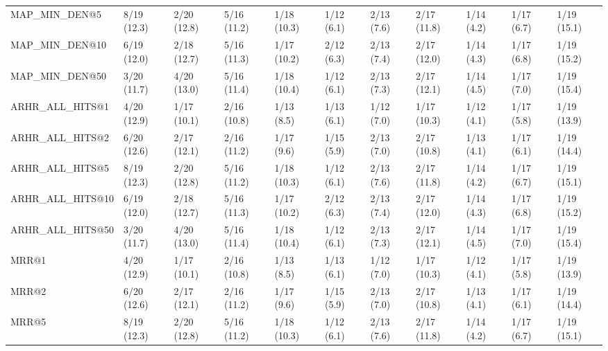 \begin{tabular}{lllllllllll}
MAP_MIN_DEN@5               &    8/19 (12.3) &    2/20 (12.8) &     5/16 (11.2) &      1/18 (10.3) &  1/12 (6.1) &  2/13 (7.6) &  2/17 (11.8) &     1/14 (4.2) &            1/17 (6.7) &        1/19 (15.1) \\
MAP_MIN_DEN@10              &    6/19 (12.0) &    2/18 (12.7) &     5/16 (11.3) &      1/17 (10.2) &  2/12 (6.3) &  2/13 (7.4) &  2/17 (12.0) &     1/14 (4.3) &            1/17 (6.8) &        1/19 (15.2) \\
MAP_MIN_DEN@50              &    3/20 (11.7) &    4/20 (13.0) &     5/16 (11.4) &      1/18 (10.4) &  1/12 (6.1) &  2/13 (7.3) &  2/17 (12.1) &     1/14 (4.5) &            1/17 (7.0) &        1/19 (15.4) \\
ARHR_ALL_HITS@1             &    4/20 (12.9) &    1/17 (10.1) &     2/16 (10.8) &       1/13 (8.5) &  1/13 (6.1) &  1/12 (7.0) &  1/17 (10.3) &     1/12 (4.1) &            1/17 (5.8) &        1/19 (13.9) \\
ARHR_ALL_HITS@2             &    6/20 (12.6) &    2/17 (12.1) &     2/16 (11.2) &       1/17 (9.6) &  1/15 (5.9) &  2/13 (7.0) &  2/17 (10.8) &     1/13 (4.1) &            1/17 (6.1) &        1/19 (14.4) \\
ARHR_ALL_HITS@5             &    8/19 (12.3) &    2/20 (12.8) &     5/16 (11.2) &      1/18 (10.3) &  1/12 (6.1) &  2/13 (7.6) &  2/17 (11.8) &     1/14 (4.2) &            1/17 (6.7) &        1/19 (15.1) \\
ARHR_ALL_HITS@10            &    6/19 (12.0) &    2/18 (12.7) &     5/16 (11.3) &      1/17 (10.2) &  2/12 (6.3) &  2/13 (7.4) &  2/17 (12.0) &     1/14 (4.3) &            1/17 (6.8) &        1/19 (15.2) \\
ARHR_ALL_HITS@50            &    3/20 (11.7) &    4/20 (13.0) &     5/16 (11.4) &      1/18 (10.4) &  1/12 (6.1) &  2/13 (7.3) &  2/17 (12.1) &     1/14 (4.5) &            1/17 (7.0) &        1/19 (15.4) \\
MRR@1                       &    4/20 (12.9) &    1/17 (10.1) &     2/16 (10.8) &       1/13 (8.5) &  1/13 (6.1) &  1/12 (7.0) &  1/17 (10.3) &     1/12 (4.1) &            1/17 (5.8) &        1/19 (13.9) \\
MRR@2                       &    6/20 (12.6) &    2/17 (12.1) &     2/16 (11.2) &       1/17 (9.6) &  1/15 (5.9) &  2/13 (7.0) &  2/17 (10.8) &     1/13 (4.1) &            1/17 (6.1) &        1/19 (14.4) \\
MRR@5                       &    8/19 (12.3) &    2/20 (12.8) &     5/16 (11.2) &      1/18 (10.3) &  1/12 (6.1) &  2/13 (7.6) &  2/17 (11.8) &     1/14 (4.2) &            1/17 (6.7) &        1/19 (15.1) \\

\end{tabular}
